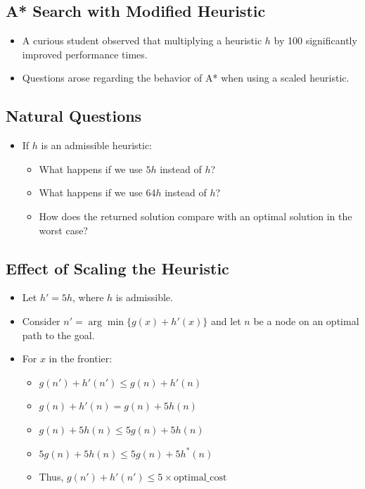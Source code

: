 \documentclass[8pt]{article}
\begin{document}
\subsection{A* Search with Modified Heuristic}
\begin{itemize}
    \item A curious student observed that multiplying a heuristic \( h \) by 100 significantly improved performance times.
    \item Questions arose regarding the behavior of A* when using a scaled heuristic.
\end{itemize}

\subsection*{Natural Questions}
\begin{itemize}
    \item If \( h \) is an admissible heuristic:
    \begin{itemize}
        \item What happens if we use \( 5h \) instead of \( h \)?
        \item What happens if we use \( 64h \) instead of \( h \)?
        \item How does the returned solution compare with an optimal solution in the worst case?
    \end{itemize}
\end{itemize}

\subsection*{Effect of Scaling the Heuristic}
\begin{itemize}
    \item Let \( h' = 5h \), where \( h \) is admissible.
    \item Consider \( n' = \arg\min \{ g(x) + h'(x) \} \) and let \( n \) be a node on an optimal path to the goal.
    \item For \( x \) in the frontier:
    \begin{itemize}
        \item \( g(n') + h'(n') \leq g(n) + h'(n) \)
        \item \( g(n) + h'(n) = g(n) + 5h(n) \)
        \item \( g(n) + 5h(n) \leq 5g(n) + 5h(n) \)
        \item \( 5g(n) + 5h(n) \leq 5g(n) + 5h^*(n) \)
        \item Thus, \( g(n') + h'(n') \leq 5 \times \text{optimal\_cost} \)
    \end{itemize}
\end{itemize}
\end{document}
